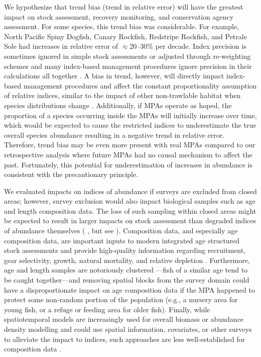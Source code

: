 \documentclass[12pt]{article}
\newcommand{\R}[1]{\label{#1}\linelabel{#1}}
\begin{document}
\begin{spacing}{1.4}
We hypothesize that trend bias (trend in relative error) will have the greatest impact on stock assessment, recovery monitoring, and conservation agency assessment.
For some species, this trend bias was considerable.
For example, North Pacific Spiny Dogfish, Canary Rockfish, Redstripe Rockfish, and Petrale Sole had increases in relative error of $\approx$20--30\% per decade.
Index precision is sometimes ignored in simple stock assessments \citep{free2020} or adjusted through re-weighting schemes \citep{francis2011} and many index-based management procedures ignore precision in their calculations all together \citep{carruthers2016}.
A bias in trend, however, will directly impact index-based management procedures and affect the constant proportionality assumption of relative indices, similar to the impact of other non-trawlable habitat when species distributions change \citep{cordue2007}.
Additionally, if MPAs operate as hoped, the proportion of a species occurring inside the MPAs will initially increase over time, which would be expected to cause the restricted indices to underestimate the true overall species abundance resulting in a negative trend in relative error.
Therefore, trend bias may be even more present with real MPAs compared to our retrospective analysis where future MPAs had no causal mechanism to affect the past.
Fortunately, this potential for underestimation of increases in abundance is consistent with the precautionary principle.

We evaluated impacts on indices of abundance if surveys are excluded from closed areas; however, survey exclusion would also impact biological samples such as \R{E4}age and length composition data.
The loss of such sampling within closed areas might be expected to result in larger impacts on stock assessment than degraded indices of abundance themselves (\citeauthor{yin2004} \citeyear{yin2004}, but see \citeauthor{chen2003} \citeyear{chen2003}).
Composition data, and especially age composition data, are important inputs to modern integrated age structured stock assessments and provide high-quality information regarding recruitment, gear selectivity, growth, natural mortality, and relative depletion \citep{magnusson2007, ono2015}.
Furthermore, age and length samples are notoriously clustered \citep{hilbornwalters1992, francis2011}---fish of a similar age tend to be caught together---and removing spatial blocks from the survey domain could have a disproportionate impact on age composition data if the MPA happened to protect some non-random portion of the population (e.g., a nursery area for young fish, or a refuge or feeding area for older fish).
Finally, while spatiotemporal models are increasingly used for overall biomass or abundance density modelling and could use spatial information, covariates, or other surveys to alleviate the impact to indices, such approaches are less well-established for composition data \citep[but see][]{thorsonhaltuch2018}.


\end{spacing}
\end{document}
